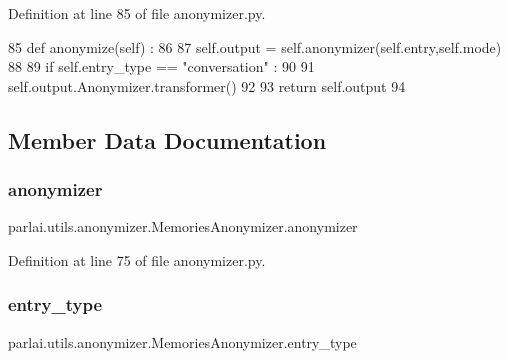 Definition at line 85 of file anonymizer.\+py.


\begin{DoxyCode}
85     \textcolor{keyword}{def }anonymize(self) : 
86 
87         self.output = self.anonymizer(self.entry,self.mode)
88 
89         \textcolor{keywordflow}{if} self.entry\_type == \textcolor{stringliteral}{"conversation"} : 
90 
91             self.output.Anonymizer.transformer()
92 
93             \textcolor{keywordflow}{return} self.output
94 
\end{DoxyCode}


\subsection{Member Data Documentation}
\mbox{\label{classparlai_1_1utils_1_1anonymizer_1_1MemoriesAnonymizer_ab8ae572f757ec11ee806e95c707ac1ea}} 
\subsubsection{\texorpdfstring{anonymizer}{anonymizer}}
{\footnotesize\ttfamily parlai.\+utils.\+anonymizer.\+Memories\+Anonymizer.\+anonymizer}



Definition at line 75 of file anonymizer.\+py.

\mbox{\label{classparlai_1_1utils_1_1anonymizer_1_1MemoriesAnonymizer_ace27f68e5f31c8b07a62a8dc781bca59}} 
\subsubsection{\texorpdfstring{entry\+\_\+type}{entry\_type}}
{\footnotesize\ttfamily parlai.\+utils.\+anonymizer.\+Memories\+Anonymizer.\+entry\+\_\+type}



